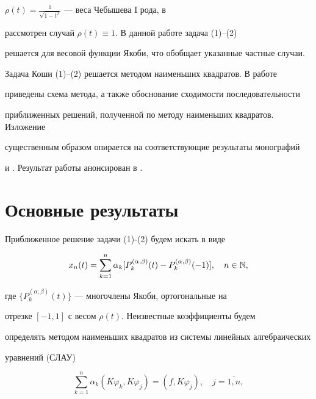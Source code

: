 $\rho(t)=\frac{1}{\sqrt{1-t^2}}$ --- веса Чебышева I рода, в \cite{7} 


рассмотрен случай $\rho(t)\equiv 1$. В данной работе задача (1)--(2) 


решается для весовой функции Якоби, что обобщает указанные частные случаи.





Задача Коши (1)--(2) решается методом наименьших квадратов. В работе 


приведены схема метода, а также обоснование сходимости последовательности 


приближенных решений, полученной по методу наименьших квадратов. Изложение 


существенным образом опирается на соответствующие результаты монографий 


\cite{1} и \cite{3}. Результат работы анонсирован в \cite{8}.








\section{Основные результаты}





Приближенное решение задачи (1)-(2) будем искать в  виде


\begin{equation}


x_n(t) = \sum_{k=1}^n\alpha_k[P_k^{(\alpha,\beta)}(t)-P_k^{(\alpha,\beta)}(-1)],


\quad n\in\Bbb{N},


\end{equation}


где $\{P_k^{(\alpha,\beta)}(t)\}$ --- многочлены Якоби, ортогональные на 


отрезке $[-1,1]$ с весом $\rho(t)$. Неизвестные коэффициенты будем 


определять методом наименьших квадратов из системы линейных алгебраических 


уравнений (СЛАУ)


\begin{equation}


\sum_{k=1}^n\alpha_k(K\varphi_k,K\varphi_j)=(f,K\varphi_j),\quad j=\overline{1,n},


\end{equation}


